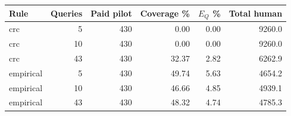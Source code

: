 \begin{tabular}{@{}lrrrrr@{}}
\toprule
Rule & Queries & Paid pilot & Coverage \% & $E_Q$ \% & Total human \\
\midrule
crc & 5 & 430 & 0.00 & 0.00 & 9260.0 \\
crc & 10 & 430 & 0.00 & 0.00 & 9260.0 \\
crc & 43 & 430 & 32.37 & 2.82 & 6262.9 \\
empirical & 5 & 430 & 49.74 & 5.63 & 4654.2 \\
empirical & 10 & 430 & 46.66 & 4.85 & 4939.1 \\
empirical & 43 & 430 & 48.32 & 4.74 & 4785.3 \\
\bottomrule
\end{tabular}
